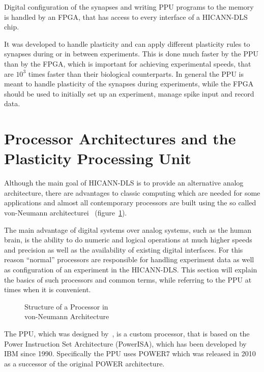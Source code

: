 Digital configuration of the synapses and writing \ac{PPU} programs to the memory is handled by an \ac{FPGA}, that has access to every interface of a \ac{HICANN-DLS} chip.

It was developed to handle plasticity and can apply different plasticity rules to synapses during or in between experiments.
This is done much faster by the \ac{PPU} than by the \ac{FPGA}, which is important for achieving experimental speeds, that are $10^{3}$ times faster than their biological counterparts.
In general the \ac{PPU} is meant to handle plasticity of the synapses during experiments, while the \ac{FPGA} should be used to initially set up an experiment, manage spike input and record data.


\section{Processor Architectures and the Plasticity Processing Unit}
Although the main goal of \ac{HICANN-DLS} is to provide an alternative analog architecture, there are advantages to classic computing which are needed for some applications and almost all contemporary processors are built using the so called von-Neumann architecturei~\cite{tanenbaum} (figure~\ref{fig:processor}).

The main advantage of digital systems over analog systems, such as the human brain, is the ability to do numeric and logical operations at much higher speeds and precision as well as the availability of existing digital interfaces.
For this reason ``normal'' processors are responsible for handling experiment data as well as configuration of an experiment in the \ac{HICANN-DLS}.
This section will explain the basics of such processors and common terms, while referring to the \ac{PPU} at times when it is convenient.
\begin{figure}
\captionsetup{format=plain, indention=.6cm, labelsep=newline,singlelinecheck=false}
    \centering
        \vspace*{6em}
        
        \vspace*{-10mm}
        \caption{\label{fig:processor} Structure of a Processor in \\ von-Neumann Architecture}
\end{figure}

The \ac{PPU}, which was designed by~\citeauthor{PPU}, is a custom processor, that is based on the Power Instruction Set Architecture (PowerISA), which has been developed by IBM since 1990. 
Specifically the \ac{PPU} uses POWER7 which was released in 2010 as a successor of the original POWER architecture.

